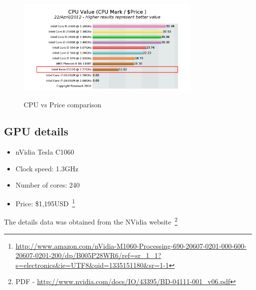 \begin{figure}[h!]
    \centering
    \includegraphics[width=0.8\textwidth]{img/cpu-price-ranking.png}
    \label{fig:cpu2}
    \caption{CPU vs Price comparison}
\end{figure}




\subsection{GPU details}
\begin{itemize}
    \item nVidia Tesla C1060
    \item Clock speed: 1.3GHz
    \item Number of cores: 240
    \item Price: \$1,195USD~\footnote{\url{http://www.amazon.com/nVidia-M1060-Processing-690-20607-0201-000-600-20607-0201-200/dp/B005P28WR6/ref=sr\_1\_1?s=electronics&ie=UTF8&qid=1335151180&sr=1-1}}
\end{itemize}


The details data was obtained from the NVidia website~\footnote{
PDF - \url{http://www.nvidia.com/docs/IO/43395/BD-04111-001\_v06.pdf}}


